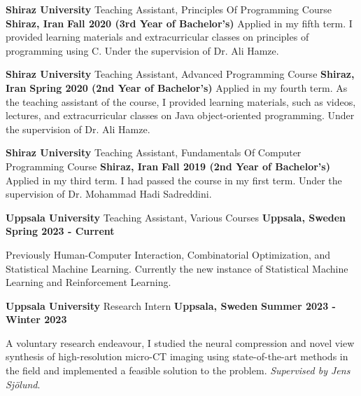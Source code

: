 \begin{cventries}
{    \cventry
    {\textbf{Shiraz University}} %
    {Teaching Assistant, Principles Of Programming Course} %
    {\textbf{Shiraz, Iran}} %
    {\textbf{Fall 2020 (3rd Year of Bachelor’s)}} %
    {
        Applied in my fifth term. I provided learning materials and extracurricular classes on principles of programming using C. Under the supervision of Dr. Ali Hamze.
    }

    \cventry
    {\textbf{Shiraz University}} %
    {Teaching Assistant, Advanced Programming Course} %
    {\textbf{Shiraz, Iran}} %
    {\textbf{Spring 2020 (2nd Year of Bachelor’s)}} %
    {
        Applied in my fourth term. As the teaching assistant of the course, I provided learning materials, such as videos, lectures, and extracurricular classes on Java object-oriented programming. Under the supervision of Dr. Ali Hamze.
    }

    \cventry
    {\textbf{Shiraz University}} %
    {Teaching Assistant, Fundamentals Of Computer Programming Course} %
    {\textbf{Shiraz, Iran}} %
    {\textbf{Fall 2019 (2nd Year of Bachelor’s)}} %
    {
        Applied in my third term. I had passed the course in my first term. Under the supervision of Dr. Mohammad Hadi Sadreddini.
    }
}
{ 
    \cventry
    {\textbf{Uppsala University}} %
    {Teaching Assistant, Various Courses} %
    {\textbf{Uppsala, Sweden}} %
    {\textbf{Spring 2023 - Current}} %
    {
      \begin{cvitems}
        \item Previously Human-Computer Interaction, Combinatorial Optimization, and Statistical Machine Learning. Currently the new instance of Statistical Machine Learning and Reinforcement Learning.
      \end{cvitems}
    }
    
    \cventry
    {\textbf{Uppsala University}} %
    {Research Intern} %
    {\textbf{Uppsala, Sweden}} %
    {\textbf{Summer 2023 - Winter 2023}} %
    {
      \begin{cvitems}
        \item A voluntary research endeavour, I studied the neural compression and novel view synthesis of high-resolution micro-CT imaging using state-of-the-art methods in the field and implemented a feasible solution to the problem. \emph{Supervised by Jens Sjölund}.
      \end{cvitems}
    }

}
\end{cventries}
